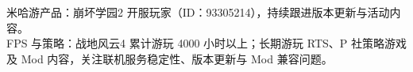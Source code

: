 

\begin{cvparagraph}

米哈游产品：崩坏学园2 开服玩家（ID：93305214），持续跟进版本更新与活动内容。\\
FPS 与策略：战地风云4 累计游玩 4000 小时以上；长期游玩 RTS、P 社策略游戏及 Mod 内容，关注联机服务稳定性、版本更新与 Mod 兼容问题。
\end{cvparagraph}
